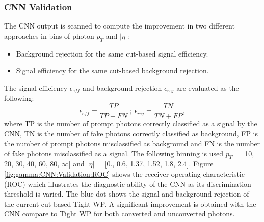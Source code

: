 \subsubsection{CNN Validation}
\label{gamma:CNN:Validation}
The CNN output is scanned to compute the improvement in two different approaches in bins of photon $p_T$ and $|\eta|$: 
\begin{itemize}
    \item Background rejection for the same cut-based signal efficiency.
    \item Signal efficiency for the same cut-based background rejection.
\end{itemize} 
The signal efficiency $\epsilon_{eff}$ and background rejection $\epsilon_{rej}$ are evaluated as the following:
\begin{equation}
    \label{eq:eff}
    \epsilon_{eff} = \frac{TP}{TP+FN} \ ; \ \epsilon_{rej} = \frac{TN}{TN+FP},
\end{equation}
where TP is the number of prompt photons correctly classified as a signal by the CNN, TN is the number of fake photons correctly classified as background, FP is the number of prompt photons misclassified as background and FN is the number of fake photons misclassified as a signal. The following binning is used $p_T$ = [10, 20, 30, 40, 60, 80, $\infty$] and $|\eta|$ = [0., 0.6, 1.37, 1.52, 1.8, 2.4].
Figure \ref{fig:gamma:CNN:Validation:ROC} shows the receiver-operating characteristic (ROC) which illustrates the diagnostic ability of the CNN as its discrimination threshold is varied. The blue dot shows the signal and background rejection of the current cut-based Tight WP. A significant improvement is obtained with the CNN compare to Tight WP for both converted and unconverted photons. 
